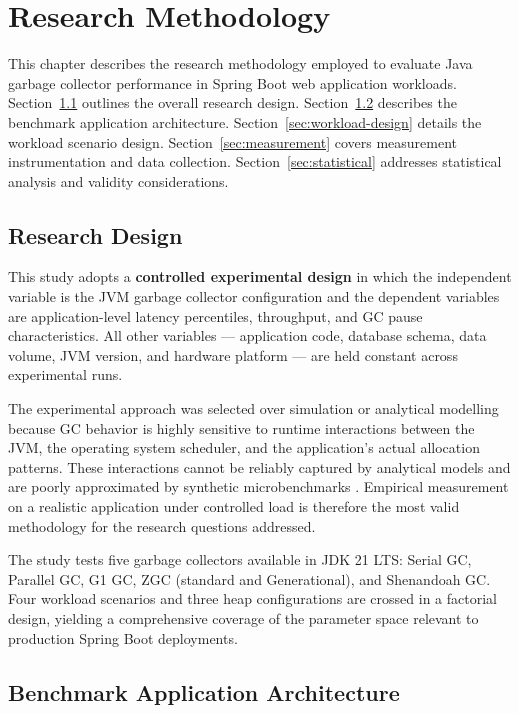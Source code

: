 \chapter{Research Methodology}
\label{chap:met}

This chapter describes the research methodology employed to evaluate Java garbage collector performance in Spring Boot web application workloads. Section~\ref{sec:research-design} outlines the overall research design. Section~\ref{sec:test-app} describes the benchmark application architecture. Section~\ref{sec:workload-design} details the workload scenario design. Section~\ref{sec:measurement} covers measurement instrumentation and data collection. Section~\ref{sec:statistical} addresses statistical analysis and validity considerations.

\section{Research Design}
\label{sec:research-design}

This study adopts a \textbf{controlled experimental design} in which the independent variable is the JVM garbage collector configuration and the dependent variables are application-level latency percentiles, throughput, and GC pause characteristics. All other variables --- application code, database schema, data volume, JVM version, and hardware platform --- are held constant across experimental runs.

The experimental approach was selected over simulation or analytical modelling because GC behavior is highly sensitive to runtime interactions between the JVM, the operating system scheduler, and the application's actual allocation patterns. These interactions cannot be reliably captured by analytical models and are poorly approximated by synthetic microbenchmarks \cite{blackburn2006dacapo}. Empirical measurement on a realistic application under controlled load is therefore the most valid methodology for the research questions addressed.

The study tests five garbage collectors available in JDK 21 LTS: Serial GC, Parallel GC, G1 GC, ZGC (standard and Generational), and Shenandoah GC. Four workload scenarios and three heap configurations are crossed in a factorial design, yielding a comprehensive coverage of the parameter space relevant to production Spring Boot deployments.

\section{Benchmark Application Architecture}
\label{sec:test-app}


